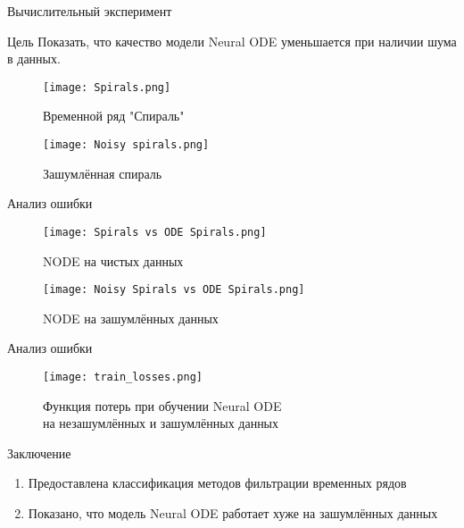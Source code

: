 \documentclass[10pt,pdf,hyperref={unicode}]{beamer}
\begin{document}
\begin{frame}{Вычислительный эксперимент}
	\begin{alertblock}{Цель}
		 Показать, что качество модели Neural ODE уменьшается при наличии шума в данных.
	\end{alertblock}
	
	\begin{multicols}{2}
		\begin{figure}
			\texttt{[image: Spirals.png]}
			\caption{Временной ряд "Спираль"}
		\end{figure}
		
		\begin{figure}[bhtp]
			\texttt{[image: Noisy spirals.png]}
			\caption{Зашумлённая спираль}
		\end{figure}
	\end{multicols}
	
\end{frame}

\begin{frame}{Анализ ошибки}
	\begin{multicols}{2}
		\begin{figure}
			\texttt{[image: Spirals vs ODE Spirals.png]}
			\caption{NODE на чистых данных}
		\end{figure}
		
		\begin{figure}[bhtp]
			\texttt{[image: Noisy Spirals vs ODE Spirals.png]}
			\caption{NODE на зашумлённых данных}
		\end{figure}
	\end{multicols}
\end{frame}

\begin{frame}{Анализ ошибки}
	\begin{figure}[bhtp]
		\texttt{[image: train\_losses.png]}
		\caption{Функция потерь при обучении Neural ODE \\ на незашумлённых и зашумлённых данных}
	\end{figure}
\end{frame}

\begin{frame}{Заключение}
	\begin{enumerate}
		\item Предоставлена классификация методов фильтрации временных рядов
		
		\item Показано, что модель Neural ODE работает хуже на зашумлённых данных
		
	\end{enumerate}
\end{frame}
\end{document}
